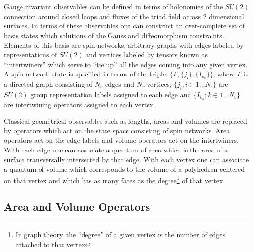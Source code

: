 \documentclass[twocolumn,draft,aps,nofootinbib,nobibnotes,final]{revtex4-2}
\begin{document}
Gauge invariant observables can be defined in terms of holonomies of the $ SU(2) $ connection around closed loops and fluxes of the triad field across 2 dimensional surfaces. In terms of these observables one can construct an over-complete set of basis states which solutions of the Gauss and diffeomorphism constraints. Elements of this basis are spin-networks, arbitrary graphs with edges labeled by representations of $ SU(2) $ and vertices labeled by tensors known as ``intertwiners'' which serve to ``tie up'' all the edges coming into any given vertex. A spin network state is specified in terms of the triple: $ \{\Gamma, \{j_i\}, \{I_{v_k}\} \} $, where $ \Gamma $ is a directed graph consisting of $ N_e $ edges and $ N_v $ vertices; $ \{ j_i; i \in 1\ldots N_e \} $ are $ SU(2) $ group representation labels assigned to each edge and $ \{I_{v_k}; k \in 1 \ldots N_v \} $ are intertwining operators assigned to each vertex.

Classical geometrical observables such as lengths, areas and volumes are replaced by operators which act on the state space consisting of spin networks.  Area operators act on the edge labels and volume operators act on the intertwiners. With each edge one can associate a quantum of area which is the area of a surface transversally intersected by that edge. With each vertex one can associate a quantum of volume which corresponds to the volume of a polyhedron centered on that vertex and which has as many faces as the degree\footnote{In graph theory, the ``degree'' of a given vertex is the number of edges attached to that vertex} of that vertex.

\subsection{Area and Volume Operators}\label{sec:geometric-ops}
\end{document}
